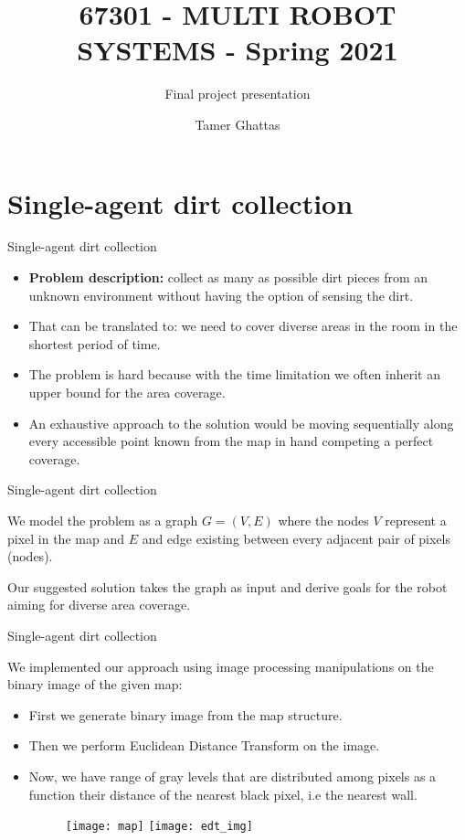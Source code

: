 \documentclass[10pt]{beamer}
\title{67301 - MULTI ROBOT SYSTEMS - Spring 2021}
\subtitle{Final project presentation}
\date{}
\author{Tamer Ghattas}
\institute{
The Hebrew University of Jerusalem School of Computer Science and Engineering
}
\begin{document}
\maketitle


\section{Single-agent dirt collection}

\begin{frame}{Single-agent dirt collection}
\begin{itemize}
    \item {\bf Problem description:} collect as many as possible dirt pieces from an unknown environment without having the option of sensing the dirt. 
    \item That can be translated to: we need to cover diverse areas in the room in the shortest period of time.
    \item The problem is hard because with the time limitation we often inherit an upper bound for the area coverage.
    \item An exhaustive approach to the solution would be moving sequentially along every accessible point known from the map in hand competing a perfect coverage.
\end{itemize}
\end{frame}


\begin{frame}{Single-agent dirt collection}

We model the problem as a graph $G=(V, E)$ where the nodes $V$ represent a pixel in the map and $E$ and edge existing between every adjacent pair of pixels (nodes).


\bigskip


Our suggested solution takes the graph as input and derive goals for the robot aiming for diverse area coverage.
\end{frame}


\begin{frame}{Single-agent dirt collection}

We implemented our approach using image processing manipulations on the binary image of the given map:
\graphicspath{{images/}}
\begin{itemize}
    \item First we generate binary image from the map structure.
    \item Then we perform Euclidean Distance Transform on the image.
    \item Now, we have range of gray levels that are distributed among pixels as a function their distance of the nearest black pixel, i.e the nearest wall.
    \bigskip
    
    \begin{figure}[htp]
    \centering
    \texttt{[image: map]}
    \texttt{[image: edt\_img]}

    \label{fig:galaxy}
\end{figure}
    
\end{itemize}
\end{frame}
\end{document}
